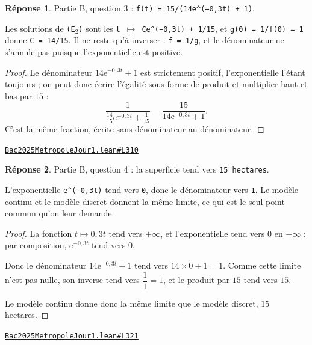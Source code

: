 \documentclass[11pt,a4paper]{article}
\theoremstyle{definition}
\theoremstyle{plain}
\theoremstyle{definition}
\newtheorem*{reponse}{Réponse}
\newcommand{\source}[2]{\par\smallskip\noindent\hfill{\footnotesize\href{#1}{\texttt{#2}}}\par\smallskip}
\begin{document}
\begin{reponse}
Partie B, question 3 : \texttt{f(t) = 15/(14e\textasciicircum{}(−0,3t) + 1)}.

Les solutions de \texttt{(E\(_{2}\))} sont les \texttt{t \(\mapsto\) Ce\textasciicircum{}(−0,3t) + 1/15}, et \texttt{g(0) = 1/f(0) = 1}
donne \texttt{C = 14/15}. Il ne reste qu'à inverser : \texttt{f = 1/g}, et le dénominateur ne
s'annule pas puisque l'exponentielle est positive.
\end{reponse}
\begin{proof}
Le dénominateur $14\mathrm{e}^{-0{,}3t} + 1$ est strictement positif, l'exponentielle
l'étant toujours ; on peut donc écrire l'égalité sous forme de produit et multiplier haut
et bas par $15$ :
\[ \frac{1}{\frac{14}{15}\mathrm{e}^{-0{,}3t} + \frac{1}{15}}
   = \frac{15}{14\mathrm{e}^{-0{,}3t} + 1} . \]
C'est la même fraction, écrite sans dénominateur au dénominateur.
\end{proof}
\source{https://github.com/Commutator-IO/learn-lean/blob/main/exams/2025/Bac2025MetropoleJour1.lean\#L310}{Bac2025MetropoleJour1.lean\#L310}

\begin{reponse}
Partie B, question 4 : la superficie tend vers \texttt{15 hectares}.

L'exponentielle \texttt{e\textasciicircum{}(−0,3t)} tend vers \texttt{0}, donc le dénominateur vers \texttt{1}. Le modèle
continu et le modèle discret donnent la même limite, ce qui est le seul point commun
qu'on leur demande.
\end{reponse}
\begin{proof}
La fonction $t \mapsto 0{,}3t$ tend vers $+\infty$, et l'exponentielle tend vers $0$ en
$-\infty$ : par composition, $\mathrm{e}^{-0{,}3t}$ tend vers $0$.

Donc le dénominateur $14\mathrm{e}^{-0{,}3t} + 1$ tend vers $14 \times 0 + 1 = 1$. Comme
cette limite n'est pas nulle, son inverse tend vers $\dfrac{1}{1} = 1$, et le produit par
$15$ tend vers $15$.

Le modèle continu donne donc la même limite que le modèle discret, $15$ hectares.
\end{proof}
\source{https://github.com/Commutator-IO/learn-lean/blob/main/exams/2025/Bac2025MetropoleJour1.lean\#L321}{Bac2025MetropoleJour1.lean\#L321}
\end{document}
